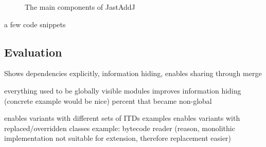 \begin{figure}[htb!]
  \begin{center}
    \caption{The main components of JastAddJ}
    \label{ModuleMainComponents}
  \end{center}
\end{figure}

a few code snippets

\subsection{Evaluation}

Shows dependencies explicitly, information hiding, enables sharing through merge

everything used to be globally visible
  modules improves information hiding 
    (concrete example would be nice)
    percent that became non-global

enables variants with different sets of ITDs
  examples
enables variants with replaced/overridden classes
  example: bytecode reader
  (reason, monolithic implementation not suitable for extension, therefore
  replacement easier)


